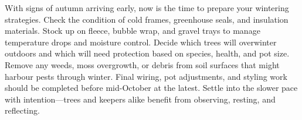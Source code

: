 \medskip  
{}  
\noindent  
With signs of autumn arriving early, now is the time to prepare your wintering strategies.  
Check the condition of cold frames, greenhouse seals, and insulation materials.  
Stock up on fleece, bubble wrap, and gravel trays to manage temperature drops and moisture control.  
%
Decide which trees will overwinter outdoors and which will need protection based on species, health, and pot size.  
Remove any weeds, moss overgrowth, or debris from soil surfaces that might harbour pests through winter.  
Final wiring, pot adjustments, and styling work should be completed before mid\--October at the latest.  
Settle into the slower pace with intention---trees and keepers alike benefit from observing, resting, and reflecting.
\closearticle  
